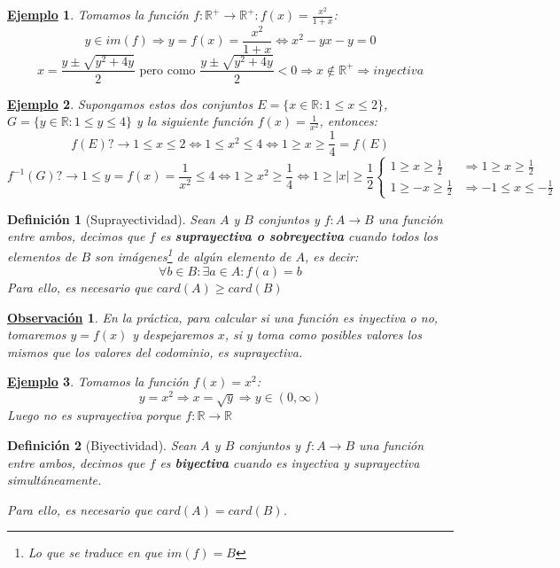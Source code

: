 \documentclass[10pt,a4paper,openright]{book}
\theoremstyle{break}
\newtheorem{defi}{Definición}[chapter]
\newtheorem{obs}{\underline{Observación}}[chapter]
\newtheorem{ej}{\underline{Ejemplo}}[chapter]
\begin{document}
\begin{ej}
Tomamos la función $f: \mathbb R^+ \rightarrow \mathbb R^+ : f(x)=\frac{x^2}{1+x}$:
$$y\in im(f)\Rightarrow y=f(x)=\frac{x^2}{1+x}\Leftrightarrow x^2-yx-y=0$$
$$x=\frac{y\pm \sqrt{y^2+4y}}{2}\mbox{ pero como }\frac{y\pm \sqrt{y^2+4y}}{2}<0\Rightarrow x\notin \mathbb R^+\Rightarrow inyectiva$$
\end{ej}

\begin{ej}
Supongamos estos dos conjuntos $E=\{x\in \mathbb R : 1\leq x\leq 2\}$, $G=\{y\in \mathbb R : 1\leq y\leq 4\}$ y la siguiente función $f(x)=\frac{1}{x^2}$, entonces:
$$f(E)?\rightarrow 1\leq x\leq 2\Leftrightarrow 1\leq x^2\leq 4\Leftrightarrow 1\geq x\geq \frac{1}{4}=f(E)$$
$$f^{-1}(G)?\rightarrow 1\leq y=f(x)=\frac{1}{x^2}\leq 4\Leftrightarrow 1\geq x^2\geq \frac{1}{4}\Leftrightarrow 1\geq |x|\geq \frac{1}{2} 
\begin{cases}
1\geq x\geq \frac{1}{2}& \Rightarrow 1\geq x\geq \frac{1}{2} \\
1\geq -x\geq \frac{1}{2}& \Rightarrow -1\leq x\leq -\frac{1}{2}
\end{cases}$$
\end{ej}

\begin{defi}[Suprayectividad]
Sean $A$ y $B$ conjuntos y $f: A \rightarrow B$ una función entre ambos, decimos que $f$ es \textbf{suprayectiva o sobreyectiva} cuando todos los elementos de $B$ son imágenes\footnote{Lo que se traduce en que $im(f)=B$} de algún elemento de $A$, es decir:
$$\forall b \in B : \exists a \in A : f(a)=b$$
Para ello, es necesario que $card(A)\geq card(B)$
\end{defi}

\begin{obs}
En la práctica, para calcular si una función es inyectiva o no, tomaremos $y=f(x)$ y despejaremos $x$, si $y$ toma como posibles valores los mismos que los valores del codominio, es suprayectiva.
\end{obs}

\begin{ej}
Tomamos la función $f(x)=x^2$:
$$y=x^2\Rightarrow x=\sqrt{y}\Rightarrow y\in (0,\infty)$$
Luego no es suprayectiva porque $f: \mathbb R \rightarrow \mathbb R$
\end{ej}

\begin{defi}[Biyectividad]
Sean $A$ y $B$ conjuntos y $f: A \rightarrow B$ una función entre ambos, decimos que $f$ es \textbf{biyectiva} cuando es inyectiva y suprayectiva simultáneamente.

Para ello, es necesario que $card(A) = card(B)$.
\end{defi}
\end{document}
